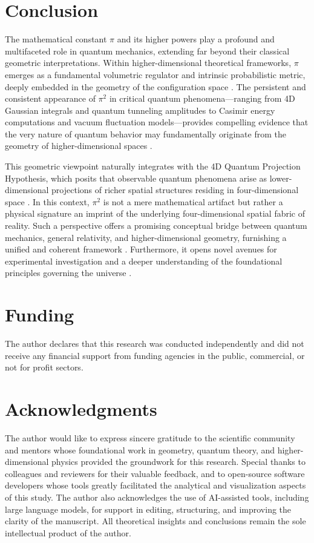 \documentclass[12pt,a4paper]{article}
\begin{document}
\section{Conclusion}

The mathematical constant \(\pi\) and its higher powers play a profound and multifaceted role in quantum mechanics, extending far beyond their classical geometric interpretations. Within higher-dimensional theoretical frameworks, \(\pi\) emerges as a fundamental volumetric regulator and intrinsic probabilistic metric, deeply embedded in the geometry of the configuration space \cite{Weyl1952, Nakahara2003}. The persistent and consistent appearance of \(\pi^2\) in critical quantum phenomena—ranging from 4D Gaussian integrals and quantum tunneling amplitudes to Casimir energy computations and vacuum fluctuation models—provides compelling evidence that the very nature of quantum behavior may fundamentally originate from the geometry of higher-dimensional spaces \cite{4d-quantum-projection, Casimir1948, Kleinert2009}.

This geometric viewpoint naturally integrates with the 4D Quantum Projection Hypothesis, which posits that observable quantum phenomena arise as lower-dimensional projections of richer spatial structures residing in four-dimensional space \cite{4d-quantum-projection}. In this context, \(\pi^2\) is not a mere mathematical artifact but rather a physical signature an imprint of the underlying four-dimensional spatial fabric of reality. Such a perspective offers a promising conceptual bridge between quantum mechanics, general relativity, and higher-dimensional geometry, furnishing a unified and coherent framework \cite{Penrose2004, Rovelli2004}. Furthermore, it opens novel avenues for experimental investigation and a deeper understanding of the foundational principles governing the universe \cite{Aspect1982, Zeilinger1999}.

\section*{Funding}
The author declares that this research was conducted independently and did not receive any financial support from funding agencies in the public, commercial, or not for profit sectors.

\section*{Acknowledgments}
The author would like to express sincere gratitude to the scientific community and mentors whose foundational work in geometry, quantum theory, and higher-dimensional physics provided the groundwork for this research. Special thanks to colleagues and reviewers for their valuable feedback, and to open-source software developers whose tools greatly facilitated the analytical and visualization aspects of this study. The author also acknowledges the use of AI-assisted tools, including large language models, for support in editing, structuring, and improving the clarity of the manuscript. All theoretical insights and conclusions remain the sole intellectual product of the author.
\end{document}
